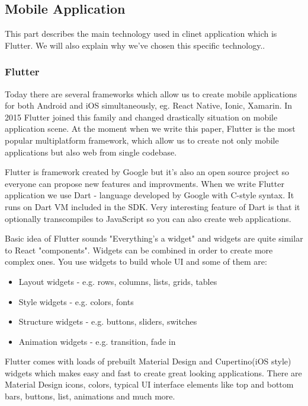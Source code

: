 \documentclass[../Main.tex]{subfiles}
\begin{document}
\newpage
\subsection{Mobile Application}
    This part describes the main technology used in clinet application which is Flutter. 
    We will also explain why we've chosen this specific technology.. 
    \subsubsection{Flutter}
        Today there are several frameworks which allow us to create mobile 
        applications for both Android and iOS simultaneously, 
        eg. React Native, Ionic, Xamarin.
        In 2015 Flutter joined this family and changed drastically situation
        on mobile application scene. At the moment when we write this paper,
        Flutter is the most popular multiplatform framework, which allow us to 
        create not only mobile applications but also web from single codebase.
    
    
        Flutter is framework created by Google but it's also an open source project 
        so everyone can propose new features and improvments. 
        When we write Flutter application we use Dart - language developed by 
        Google with C-style syntax.
        It runs on Dart VM included in the SDK. 
        Very interesting feature of Dart is that it optionally transcompiles to 
        JavaScript so you can also create web applications.
        
        
        Basic idea of Flutter sounds "Everything’s a widget" and widgets are 
        quite similar to React "components". 
        Widgets can be combined in order to create more complex ones. 
        You use widgets to build whole UI and some of them are:
        \begin{itemize}
            \item Layout widgets - e.g. rows, columns, lists, grids, tables
            \item Style widgets - e.g. colors, fonts
            \item Structure widgets - e.g. buttons, sliders, switches
            \item Animation widgets - e.g. transition, fade in
        \end{itemize}
        Flutter comes with loads of prebuilt Material Design and Cupertino(iOS style)
        widgets which makes easy and fast to create great looking applications. 
        There are Material Design icons, colors, typical UI interface 
        elements like top and bottom bars, buttons, list, animations and much more.
        
\end{document}
